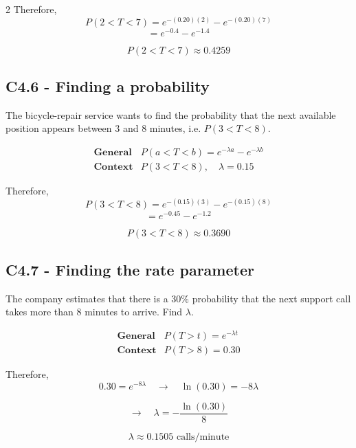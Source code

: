 \begin{multicols}{2}
Therefore,
\[
P(2<T<7)
=e^{-(0.20)(2)}-e^{-(0.20)(7)}
\]
\[
=e^{-0.4}-e^{-1.4}
\]

\[
\boxed{P(2<T<7)\approx0.4259}
\]

\newpage 


\subsection*{C4.6 - Finding a probability}
\label{subsec:c4-probability-bicycle}

The bicycle-repair service wants to find the probability that the next
available position appears between 3 and 8 minutes, i.e. $P(3<T<8)$.

\[
\begin{array}{c|c}
	\textbf{General} & P(a<T<b)=e^{-\lambda a}-e^{-\lambda b}\\[6pt]
	\textbf{Context} & P(3<T<8),\quad \lambda=0.15
\end{array}
\]

Therefore,
\[
P(3<T<8)
=e^{-(0.15)(3)}-e^{-(0.15)(8)}
\]
\[
=e^{-0.45}-e^{-1.2}
\]

\[
\boxed{P(3<T<8)\approx0.3690}
\]



\subsection*{C4.7 - Finding the rate parameter}
\label{subsec:c4-find-rate-support}

The company estimates that there is a $30\%$ probability that the next
support call takes more than 8 minutes to arrive. Find $\lambda$.

\[
\begin{array}{c|c}
	\textbf{General} & P(T>t)=e^{-\lambda t}\\[6pt]
	\textbf{Context} & P(T>8)=0.30
\end{array}
\]

Therefore,
\[
0.30=e^{-8\lambda}
\quad\longrightarrow\quad
\ln(0.30)=-8\lambda
\]

\[
\longrightarrow\quad
\lambda=-\frac{\ln(0.30)}{8}
\]

\[
\boxed{\lambda\approx0.1505\text{ calls/minute}}
\]



\end{multicols}
